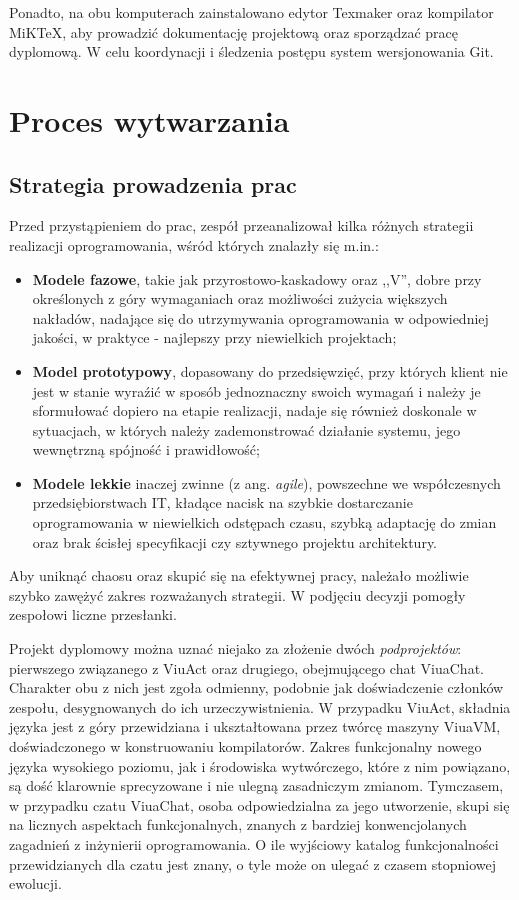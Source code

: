\documentclass[11pt,oneside,a4paper,titlepage,onecolumn]{article}
\begin{document}
Ponadto, na obu komputerach zainstalowano edytor Texmaker oraz kompilator MiKTeX, aby prowadzić
dokumentację projektową oraz sporządzać pracę dyplomową. W celu koordynacji i śledzenia postępu
system wersjonowania Git.

\section{Proces wytwarzania}

\subsection{Strategia prowadzenia prac}
Przed przystąpieniem do prac, zespół przeanalizował kilka różnych strategii realizacji oprogramowania, wśród których znalazły się m.in.:
\begin{itemize}
	\item \textbf{Modele fazowe}, takie jak przyrostowo-kaskadowy oraz ,,V'', dobre przy określonych z góry wymaganiach 
	oraz możliwości zużycia większych nakładów, nadające się do utrzymywania oprogramowania w odpowiedniej jakości, w praktyce - najlepszy przy niewielkich projektach;
	\item \textbf{Model prototypowy}, dopasowany do przedsięwzięć, przy których klient nie jest w stanie wyraźić w sposób jednoznaczny swoich wymagań i należy je sformułować dopiero na etapie realizacji, nadaje się również doskonale w sytuacjach, w których należy zademonstrować działanie systemu, jego wewnętrzną spójność i prawidłowość;
	\item \textbf{Modele lekkie} inaczej zwinne (z ang. \textit{agile}), powszechne we współczesnych przedsiębiorstwach IT, kładące nacisk na szybkie dostarczanie oprogramowania w niewielkich odstępach czasu, szybką adaptację do zmian oraz brak ścisłej specyfikacji czy sztywnego projektu architektury.
\end{itemize}

Aby uniknąć chaosu oraz skupić się na efektywnej pracy, należało możliwie szybko zawężyć zakres rozważanych strategii. W podjęciu decyzji pomogły zespołowi liczne przesłanki. 

Projekt dyplomowy można uznać niejako za złożenie dwóch \textit{podprojektów}: pierwszego związanego z ViuAct oraz drugiego, obejmującego chat ViuaChat. Charakter obu z nich jest zgoła odmienny, podobnie jak doświadczenie członków zespołu, desygnowanych do ich urzeczywistnienia. W przypadku ViuAct, składnia języka jest z góry przewidziana i ukształtowana przez twórcę maszyny ViuaVM, doświadczonego w konstruowaniu kompilatorów. Zakres funkcjonalny nowego języka wysokiego poziomu, jak i środowiska wytwórczego, które z nim powiązano, są dość klarownie sprecyzowane i nie ulegną zasadniczym zmianom. Tymczasem, w przypadku czatu ViuaChat, osoba odpowiedzialna za jego utworzenie, skupi się na licznych aspektach funkcjonalnych, znanych z bardziej konwencjolanych zagadnień z inżynierii oprogramowania. O ile wyjściowy katalog funkcjonalności przewidzianych dla czatu jest znany, o tyle może on ulegać z czasem stopniowej ewolucji.
\end{document}
